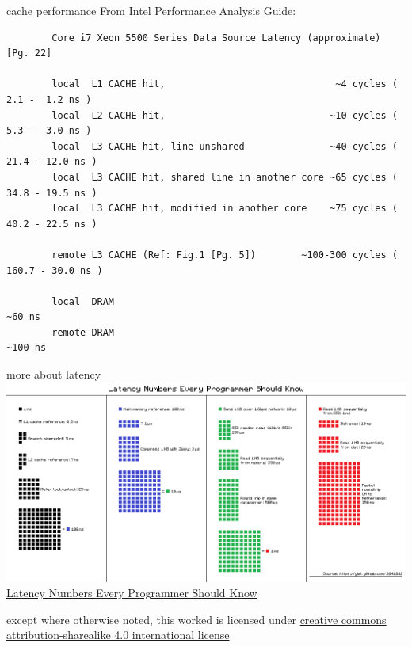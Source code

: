 \documentclass[10pt, t]{beamer}
\begin{document}
  \begin{frame}[fragile]{cache performance}
    From Intel Performance Analysis Guide:
    \begin{tiny}
      \begin{verbatim}
        Core i7 Xeon 5500 Series Data Source Latency (approximate)               [Pg. 22]

        local  L1 CACHE hit,                              ~4 cycles (   2.1 -  1.2 ns )
        local  L2 CACHE hit,                             ~10 cycles (   5.3 -  3.0 ns )
        local  L3 CACHE hit, line unshared               ~40 cycles (  21.4 - 12.0 ns )
        local  L3 CACHE hit, shared line in another core ~65 cycles (  34.8 - 19.5 ns )
        local  L3 CACHE hit, modified in another core    ~75 cycles (  40.2 - 22.5 ns )

        remote L3 CACHE (Ref: Fig.1 [Pg. 5])        ~100-300 cycles ( 160.7 - 30.0 ns )

        local  DRAM                                                   ~60 ns
        remote DRAM                                                  ~100 ns
      \end{verbatim}
    \end{tiny}
  \end{frame}

  \begin{frame}{more about latency}
    \includegraphics[width=\textwidth]{cache-perf.png}\\
    \hfill \tiny{\href{https://i.stack.imgur.com/a7jWu.png}{Latency Numbers
    Every Programmer Should Know}}
  \end{frame}

  \appendix

  \begin{frame}[c]
    \begin{center}\ccbysa\end{center}

    except where otherwise noted, this worked is licensed under
    \href{http://creativecommons.org/licenses/by-sa/4.0/}{creative commons
    attribution-sharealike 4.0 international license}
  \end{frame}
\end{document}
